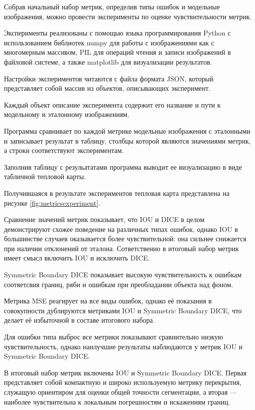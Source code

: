 Собрав начальный набор метрик, определив типы ошибок и модельные изображения, можно провести эксперименты по оценке чувствительности метрик.

Эксперименты реализованы с помощью языка программирования Python с использованием библиотек numpy для работы с изображениями как с многомерным массивом, PIL для операций чтения и записи изображений в файловой системе, а также matplotlib для визуализации результатов.

Настройки экспериментов читаются с файла формата JSON, который представляет собой массив из объектов, описывающих эксперимент. 

Каждый объект описание эксперимента содержит его название и пути к модельному и эталонному изображениям.

Программа сравнивает по каждой метрике модельные изображения с эталонными и записывает результат в таблицу, столбцы которой являются значениями метрик, а строки соответствуют экспериментам.

Заполнив таблицу с резульататами программа выводит ее визуализацию в виде табличной тепловой карты.

Получившаяся в результате экспериментов тепловая карта представлена на рисунке \ref{fig:metricsexperiment}.


Сравнение значений метрик показывает, что IOU и DICE в целом демонстрируют схожее поведение на различных типах ошибок, однако IOU в большинстве случаев оказывается более чувствительной: она сильнее снижается при наличии отклонений от эталона. Сответственно в итоговый набор метрик имеет  смысл включить IOU и исключить DICE.

Symmetric Boundary DICE показывает высокую чувствительность к ошибкам соответсвия границ, ряби и ошибкам при преобладании объекта над фоном. 

Метрика MSE реагирует на все виды ошибок, однако её показания в совокупности дублируются метриками IOU и Symmetric Boundary DICE, что делает её избыточной в составе итогового набора.

Для ошибки типа выброс все метрики показывают сравнительно низкую чувствительность, однако наилучшие результаты наблюдаются у метрик IOU и Symmetric Boundary DICE.

В итоговый набор метрик включены IOU и Symmetric Boundary DICE. Первая представляет собой компактную и широко используемую метрику перекрытия, служащую ориентиром для оценки общей точности сегментации, а вторая — наиболее чувствительна к локальным погрешностям и искажениям границ.

